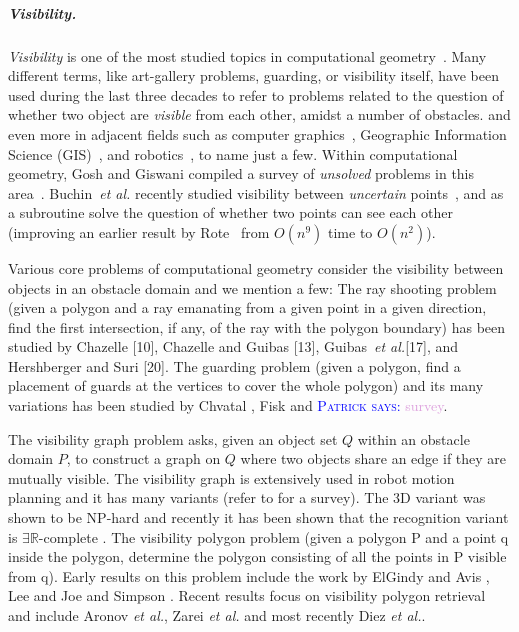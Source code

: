 \documentclass[a4paper, UKenglish]{paper}
\newcommand{\myremark}[4]{\textcolor{blue}{\textsc{#1 #2:}} \textcolor{#4}{\textsf{#3}}}
\newcommand{\patrick}[2][says]{\myremark{Patrick}{#1}{#2}{Plum}}
\newcommand{\etal}{\textit{et al.}\xspace}
\begin{document}
\subparagraph {Visibility.}

\emph{Visibility} is one of the most studied topics in computational geometry~\cite {moet,welzl1985constructing,POCCHIOLA1996279}.
Many different terms, like art-gallery problems, guarding, or visibility itself, have been used during the last three decades to refer to problems related to the question of whether two object are \emph{visible} from each other, amidst a number of obstacles.
and even more in adjacent fields such as computer graphics~\cite {Durand00amultidisciplinary}, Geographic Information Science (GIS)~\cite{FM03}, and robotics~\cite {moet}, to name just a few.
Within computational geometry, Gosh and Giswani compiled a survey of {\em unsolved} problems in this area~\cite {Ghosh:2013:UPV:2543581.2543589}.
Buchin~\etal recently studied visibility between {\em uncertain} points~\cite {bkls-rbavil-19}, and as a subroutine solve the question of whether two points can see each other (improving an earlier result by Rote~\cite{r-dc-13} from $O(n^9)$ time to $O(n^2)$).


Various core problems of computational geometry consider the visibility between objects in an obstacle domain and we mention a few:
The ray shooting problem (given a polygon and a ray emanating from a given point in a given direction, find the first intersection, if any, of the ray with the polygon boundary) has been studied by Chazelle [10], Chazelle and Guibas [13], Guibas~\etal [17], and Hershberger and Suri [20]. The guarding problem (given a polygon, find a placement of guards at the vertices to cover the whole polygon) and its many variations has been studied by Chvatal \cite{Chvatal75}, Fisk \cite{Fisk78} and \patrick{survey}.

The visibility graph problem asks, given an object set $Q$ within an obstacle domain $P$, to construct a graph on $Q$ where two objects share an edge if they are mutually visible. The visibility graph is extensively used in robot motion planning \cite{de1997computational} and it has many variants (refer to \cite{Ghosh:2013:UPV:2543581.2543589} for a survey). The 3D variant was shown to be NP-hard \cite{canny1988complexity} and recently it has been shown that the recognition variant is $\exists \mathbb{R}$-complete \cite{cardinal2017recognition}. The visibility polygon problem (given a polygon P and a point q inside the polygon, determine the polygon consisting of all the points in P visible from q). Early results on this problem include the work by ElGindy and Avis \cite{el1981linear}, Lee \cite{lee1983visibility} and Joe and Simpson \cite{joe1987corrections}. Recent results focus on visibility polygon retrieval and include Aronov \etal \cite{aronov2002visibility}, Zarei \etal \cite{zarei2005efficient} and most recently Diez \etal \cite{DKRRS2017KineticAPSPEuroCG}.
\end{document}
